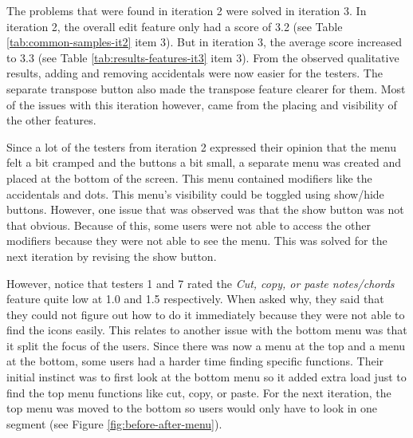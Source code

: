 			The problems that were found in iteration 2 were solved in iteration 3. In iteration 2, the overall edit feature only had a score of 3.2 (see Table \ref{tab:common-samples-it2} item 3). But in iteration 3, the average score increased to 3.3 (see Table \ref{tab:results-features-it3} item 3). From the observed qualitative results, adding and removing accidentals were now easier for the testers. The separate transpose button also made the transpose feature clearer for them. Most of the issues with this iteration however, came from the placing and visibility of the other features. 


			Since a lot of the testers from iteration 2 expressed their opinion that the menu felt a bit cramped and the buttons a bit small, a separate menu was created and placed at the bottom of the screen. This menu contained modifiers like the accidentals and dots. This menu's visibility could be toggled using show/hide buttons. However, one issue that was observed was that the show button was not that obvious. Because of this, some users were not able to access the other modifiers because they were not able to see the menu. This was solved for the next iteration by revising the show button. 

			However, notice that testers 1 and 7 rated the \textit{Cut, copy, or paste notes/chords} feature quite low at 1.0 and 1.5 respectively. When asked why, they said that they could not figure out how to do it immediately because they were not able to find the icons easily. This relates to another issue with the bottom menu was that it split the focus of the users. Since there was now a menu at the top and a menu at the bottom, some users had a harder time finding specific functions. Their initial instinct was to first look at the bottom menu so it added extra load just to find the top menu functions like cut, copy, or paste. For the next iteration, the top menu was moved to the bottom so users would only have to look in one segment (see Figure \ref{fig:before-after-menu}). 

